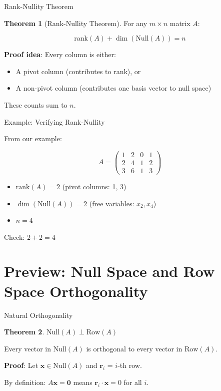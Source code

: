 \documentclass[10pt]{beamer}
\theoremstyle{definition}
\newtheorem{thm}{Theorem}[section]
\newcommand{\x}[1]{\alert{\textbf{#1}}}
\begin{document}
\begin{frame}{Rank-Nullity Theorem}

\begin{thm}[Rank-Nullity Theorem]
For any $m \times n$ matrix $A$:

$$\boxed{\text{rank}(A) + \dim(\text{Null}(A)) = n}$$
\end{thm}

\vspace{1em}

\x{Proof idea}: Every column is either:
\begin{itemize}
\item A pivot column (contributes to rank), or
\item A non-pivot column (contributes one basis vector to null space)
\end{itemize}

These counts sum to $n$.

\end{frame}

\begin{frame}{Example: Verifying Rank-Nullity}

From our example:

$$A = \begin{pmatrix}
1 & 2 & 0 & 1 \\
2 & 4 & 1 & 2 \\
3 & 6 & 1 & 3
\end{pmatrix}$$

\begin{itemize}
\item $\text{rank}(A) = 2$ (pivot columns: 1, 3)
\item $\dim(\text{Null}(A)) = 2$ (free variables: $x_2, x_4$)
\item $n = 4$
\end{itemize}

Check: $2 + 2 = 4$ \checkmark

\end{frame}

\section{Preview: Null Space and Row Space Orthogonality}

\begin{frame}{Natural Orthogonality}

\begin{thm}
$\text{Null}(A) \perp \text{Row}(A)$

Every vector in $\text{Null}(A)$ is orthogonal to every vector in $\text{Row}(A)$.
\end{thm}

\vspace{1em}

\x{Proof}: Let $\mathbf{x} \in \text{Null}(A)$ and $\mathbf{r}_i$ = $i$-th row.

By definition: $A\mathbf{x} = \mathbf{0}$ means $\mathbf{r}_i \cdot \mathbf{x} = 0$ for all $i$.

\end{frame}
\end{document}
